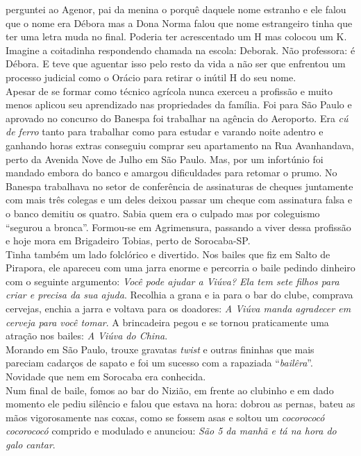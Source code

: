 \documentclass[12pt,brazil,]{book}
\begin{document}
perguntei ao Agenor, pai da menina o porquê daquele nome estranho e ele
falou que o nome era Débora mas a Dona Norma falou que nome estrangeiro
tinha que ter uma letra muda no final. Poderia ter acrescentado um H mas
colocou um K. Imagine a coitadinha respondendo chamada na escola:
Deborak. Não professora: é Débora. E teve que aguentar isso pelo resto
da vida a não ser que enfrentou um processo judicial como o Orácio para
retirar o inútil H do seu nome.\\
Apesar de se formar como técnico agrícola nunca exerceu a profissão e
muito menos aplicou seu aprendizado nas propriedades da família. Foi
para São Paulo e aprovado no concurso do Banespa foi trabalhar na
agência do Aeroporto. Era \emph{cú de ferro} tanto para trabalhar como
para estudar e varando noite adentro e ganhando horas extras conseguiu
comprar seu apartamento na Rua Avanhandava, perto da Avenida Nove de
Julho em São Paulo. Mas, por um infortúnio foi mandado embora do banco e
amargou dificuldades para retomar o prumo. No Banespa trabalhava no
setor de conferência de assinaturas de cheques juntamente com mais três
colegas e um deles deixou passar um cheque com assinatura falsa e o
banco demitiu os quatro. Sabia quem era o culpado mas por coleguismo
``segurou a bronca''. Formou-se em Agrimensura, passando a viver dessa
profissão e hoje mora em Brigadeiro Tobias, perto de Sorocaba-SP.\\
Tinha também um lado folclórico e divertido. Nos bailes que fiz em Salto
de Pirapora, ele apareceu com uma jarra enorme e percorria o baile
pedindo dinheiro com o seguinte argumento: \emph{Você pode ajudar a
Viúva? Ela tem sete filhos para criar e precisa da sua ajuda}. Recolhia
a grana e ia para o bar do clube, comprava cervejas, enchia a jarra e
voltava para os doadores: \emph{A Viúva manda agradecer em cerveja para
você tomar}. A brincadeira pegou e se tornou praticamente uma atração
nos bailes: \emph{A Viúva do China}.\\
Morando em São Paulo, trouxe gravatas \emph{twist} e outras fininhas que
mais pareciam cadarços de sapato e foi um sucesso com a rapaziada
``\emph{bailêra}''. Novidade que nem em Sorocaba era conhecida.\\
Num final de baile, fomos ao bar do Nizião, em frente ao clubinho e em
dado momento ele pediu silêncio e falou que estava na hora: dobrou as
pernas, bateu as mãos vigorosamente nas coxas, como se fossem asas e
soltou um \emph{cocorococó cocorococó} comprido e modulado e anunciou:
\emph{São 5 da manhã e tá na hora do galo cantar}.
\end{document}
